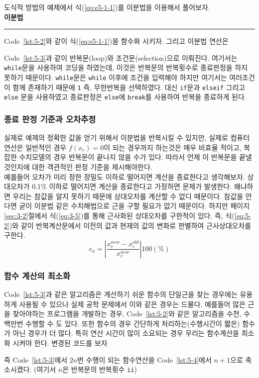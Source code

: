 도식적 방법의 예제에서 식(\ref{eq:e5-1-1})를 이분법을 이용해서 풀어보자.
\\
 \textbf{이분법}\\
\rule{\textwidth}{0.1pt}


Code~\ref{lst:5-2}와 같이 식(\ref{eq:e5-1-1})을 함수화 시키자. 그리고 이분법 연산은

Code~\ref{lst:5-3}과 같이 반복문(loop)와 조건문(selection)으로 이뤄진다. 여기서는 \texttt{while}문을 사용하여 코딩을 하였는데, 이것은 반복문의 반복횟수로 종료판정을 하지 못하기 때문이다. \texttt{while}문은 \texttt{while} 이후에 조건을 입력해야 하지만 여기서는 여러조건이 함께 존재하기 때문에 \texttt{1} 즉, 무한반복을 선택하였다. 대신 \texttt{if}문과 \texttt{elseif} 그리고 \texttt{else} 문을 사용하였고 종료판정은 \texttt{else}에 \texttt{break}를 사용하여 반복을 종료하게 된다.

\subsubsection{종료 판정 기준과 오차추정}
실제로 예제의 정확한 값을 얻기 위해서 이분법을 반복시킬 수 있지만, 실제로 컴퓨터 연산은 일반적인 경우 $f(x_{r})=0$이 되는 경우까지 하는것은 매우 비효율 적이고, 복잡한 수치모델의 경우 반복문이 끝나지 않을 수가 있다. 따라서 언제 이 반복문을 끝낼 것인지에 대한 객관적인 판정 기준을 제시해야한다.\\
예를들어 오차가 미리 정한 정밀도 이하로 떨어지면 계산을 종료한다고 생각해보자. 상대오차가 0.1\% 이하로 떨어지면 계산을 종료한다고 가정하면 문제가 발생한다. 왜냐하면 우리는 참값을 알지 못하기 때문에 상대오차를 계산할 수 없디 때문이다. 참값을 안다면 굳이 이분법 같은 수치해법으로 근을 구할 필요가 없기 때문이다. 하지만 \pageref{sec:3-2}페이지 \ref{sec:3-2}절에서 식(\ref{eq:3-5})를 통해 근사화된 상대오차를 구한적이 있다. 즉, 식(\ref{eq:5-2})와 같이 반복계산문에서 이전의 값과 현재의 값의 변화로 판별하여 근사상대오차를 구한다.
\begin{equation}\label{eq:5-2}
e_{a}=\left|\frac{x_{r}^{new}-x_{r}^{old}}{x_{r}^{new}}\right|100(\%)
\end{equation}

\subsubsection{함수 계산의 최소화}
Code~\ref{lst:5-3}과 같은 알고리즘은 계산하기 쉬운 함수의 단일근을 찾는 경우에는 유용하게 사용될 수 있으나 실제 공학 문제에서 이와 같은 경우는 드물다. 예를들어 많은 근을 찾아야하는 프로그램을 개발하는 경우, Code~\ref{lst:5-2}와 같은 알고리즘을 수천, 수백만번 수행할 수 도 있다. 또한 함수의 경우 간단하게 처리하는(수행시간이 짧은) 함수가 아닌 경우가 더 많다. 특히 연산 시간이 많이 소요되는 경우 우리는 함수계산을 최소화 시켜야 한다. 
변경된 코드를 보자

즉 Code~\ref{lst:5-3}에서 $2n$번 수행이 되는 함수연산을 Code~\ref{lst:5-4}에서 $n+1$으로 축소시켰다. (여기서 $n$은 반복문의 반복횟수 \texttt{ii})


